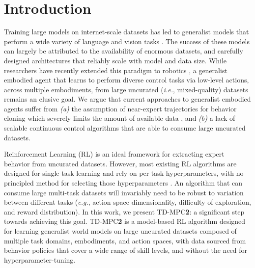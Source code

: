 \documentclass{article}
\begin{document}
\section{Introduction}
\label{sec:introduction}
\vspace{-0.05in}
Training large models on internet-scale datasets has led to generalist models that perform a wide variety of language and vision tasks \citep{Brown2020LanguageMA,he2022masked,kirillov2023segany}. The success of these models can largely be attributed to the availability of enormous datasets, and carefully designed architectures that reliably scale with model and data size. While researchers have recently extended this paradigm to robotics \citep{reed2022generalist,brohan2023rt}, a generalist embodied agent that learns to perform diverse control tasks via low-level actions, across multiple embodiments, from large uncurated (\emph{i.e.}, mixed-quality) datasets remains an elusive goal. We argue that current approaches to generalist embodied agents suffer from \emph{(a)} the assumption of near-expert trajectories for behavior cloning which severely limits the amount of available data \citep{reed2022generalist,lee2022multi,kumar2022should,schubert2023generalist,driess2023palm,brohan2023rt}, and \emph{(b)} a lack of scalable continuous control algorithms that are able to consume large uncurated datasets.

Reinforcement Learning (RL) is an ideal framework for extracting expert behavior from uncurated datasets. However, most existing RL algorithms \citep{Lillicrap2016ContinuousCW, Haarnoja2018SoftAA} are designed for single-task learning and rely on per-task hyperparameters, with no principled method for selecting those hyperparameters \citep{zhang2021importance}. An algorithm that can consume large multi-task datasets will invariably need to be robust to variation between different tasks (\emph{e.g.}, action space dimensionality, difficulty of exploration, and reward distribution). In this work, we present TD-MPC\textbf{2}: a significant step towards achieving this goal. TD-MPC\textbf{2} is a model-based RL algorithm designed for learning generalist world models on large uncurated datasets composed of multiple task domains, embodiments, and action spaces, with data sourced from behavior policies that cover a wide range of skill levels, and without the need for hyperparameter-tuning.
\end{document}
